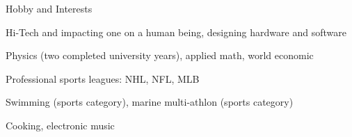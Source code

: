 \documentclass{template}
\begin{document}

\begin{rSection}{Hobby and Interests}

\begin{rHobby}
\item Hi-Tech and impacting one on a human being, designing hardware and software
\item Physics (two completed university years), applied math, world economic
\item Professional sports leagues: NHL, NFL, MLB
\item Swimming (sports category), marine multi-athlon (sports category)
\item Cooking, electronic music
\end{rHobby}

\end{rSection}

\end{document}
